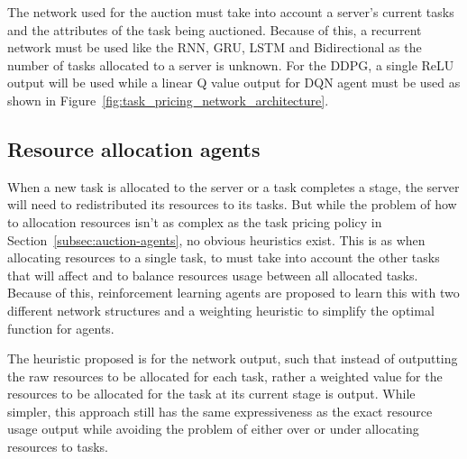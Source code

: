 The network used for the auction must take into account a server's current tasks and the attributes of the task being
auctioned. Because of this, a recurrent network must be used like the RNN, GRU, LSTM and Bidirectional as the number
of tasks allocated to a server is unknown. For the DDPG, a single ReLU output will be used while a linear Q value output
for DQN agent must be used as shown in Figure~\ref{fig:task_pricing_network_architecture}.

\subsection{Resource allocation agents}
\label{subsec:resource-allocation-agents}
When a new task is allocated to the server or a task completes a stage, the server will need to redistributed its
resources to its tasks. But while the problem of how to allocation resources isn't as complex as the task pricing policy
in Section~\ref{subsec:auction-agents}, no obvious heuristics exist. This is as when allocating resources to a single
task, to must take into account the other tasks that will affect and to balance resources usage between all
allocated tasks. Because of this, reinforcement learning agents are proposed to learn this with two
different network structures and a weighting heuristic to simplify the optimal function for agents.

The heuristic proposed is for the network output, such that instead of outputting the raw resources to be allocated
for each task, rather a weighted value for the resources to be allocated for the task at its current stage is output.
While simpler, this approach still has the same expressiveness as the exact resource usage output while avoiding
the problem of either over or under allocating resources to tasks.

